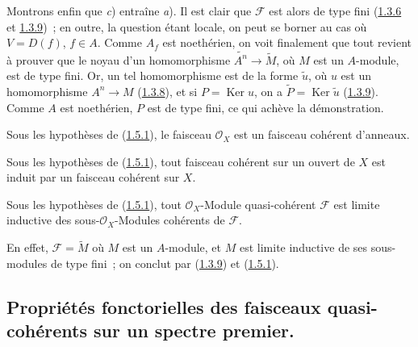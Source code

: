 Montrons enfin que \textit{c}) entraîne \textit{a}). Il est clair que
$\mathscr{F}$ est alors de type fini
(\hyperref[I.1.3.6-fr]{1.3.6} et \hyperref[I.1.3.9-fr]{1.3.9})~; en outre,
la question étant locale, on peut se borner au cas où $V=D(f)$, $f\in A$.
Comme $A_f$ est noethérien, on voit finalement que tout revient à prouver
que le noyau d'un homomorphisme $\widetilde{A^n}\to\widetilde{M}$, où $M$
est un $A$-module, est de type fini. Or, un tel homomorphisme est de la
forme $\widetilde{u}$, où $u$ est un homomorphisme $A^n\to M$
(\hyperref[I.1.3.8-fr]{1.3.8}), et si $P=\operatorname{Ker}u$, on a
$\widetilde{P}=\operatorname{Ker}\widetilde{u}$
(\hyperref[I.1.3.9-fr]{1.3.9}). Comme $A$ est noethérien, $P$ est de type
fini, ce qui achève la démonstration.

\begin{corollary}[1.5.2]
\label{I.1.5.2-fr}
Sous les hypothèses de (\hyperref[I.1.5.1-fr]{1.5.1}), le faisceau
$\mathscr{O}_X$ est un faisceau cohérent d'anneaux.
\end{corollary}

\begin{corollary}[1.5.3]
\label{I.1.5.3-fr}
Sous les hypothèses de (\hyperref[I.1.5.1-fr]{1.5.1}), tout faisceau
cohérent sur un ouvert de $X$ est induit par un faisceau cohérent sur $X$.
\end{corollary}

\begin{corollary}[1.5.4]
\label{I.1.5.4-fr}
Sous les hypothèses de (\hyperref[I.1.5.1-fr]{1.5.1}), tout
$\mathscr{O}_X$-Module quasi-cohérent $\mathscr{F}$ est limite inductive
des sous-$\mathscr{O}_X$-Modules cohérents de $\mathscr{F}$.
\end{corollary}

En effet, $\mathscr{F}=\widetilde{M}$ où $M$ est un $A$-module, et $M$ est
limite inductive de ses sous-modules de type fini~; on conclut par
(\hyperref[I.1.3.9-fr]{1.3.9}) et
(\hyperref[I.1.5.1-fr]{1.5.1}).

\subsection{Propriétés fonctorielles des faisceaux quasi-cohérents sur un
spectre premier.}
\label{subsection:I.1.6-fr}

